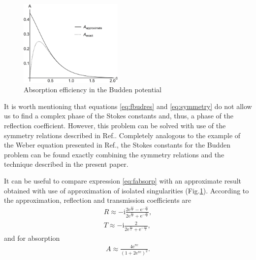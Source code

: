 \documentclass[aip,jmp,reprint]{revtex4-1}
\def\rmi{\mathrm{i}}
\def\rme{\mathrm{e}}
\def\mytextwidth{0.45\textwidth}
\begin{document}
\begin{figure}
\centering
\noindent
\includegraphics[width=\mytextwidth]{stuff/absorp.png}
\caption{Absorption efficiency in the Budden potential}
\label{fig:absorp}
\end{figure} 

It is worth mentioning that equations \eqref{eq:fbudres} and \eqref{eq:symmetry} do not allow us
to find a complex phase of the Stokes constants and, thus, a phase of the reflection coefficient.
However, this problem can be solved with use of the symmetry relations described in 
Ref.. Completely analogous to the example of the Weber equation presented in
Ref., the Stokes constants for the Budden problem can be found exactly combining
the symmetry relations and the technique described in the present paper.

It can be useful to compare expression \eqref{eq:fabsorp} with an approximate result 
obtained with use of approximation of isolated singularities (Fig.\ref{fig:absorp}). According to the 
approximation\cite{rwbook}, reflection and transmission coefficients are
\begin{eqnarray}
R \approx 
-\rmi \frac{2 \rme^{\frac{\pi c}{2}} - \rme^{-\frac{\pi c}{2}}}{2 \rme^{\frac{\pi c}{2}} + \rme^{-\frac{\pi c}{2}}},
\\
T \approx -\rmi \frac{2}{2 \rme^{\frac{\pi c}{2}} + \rme^{-\frac{\pi c}{2}}},
\end{eqnarray}
and for absorption
\begin{eqnarray}
A \approx \frac{4 \rme^{\pi c}}{(1 + 2 \rme^{\pi c})^2}.
\label{eq:aisabsorp}
\end{eqnarray}
\end{document}
